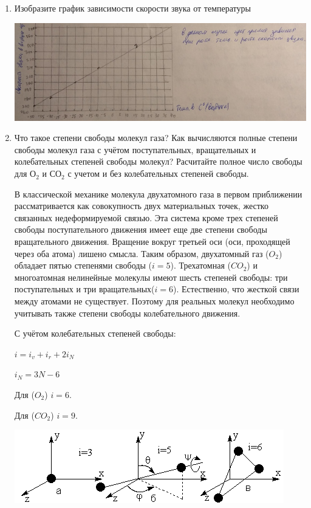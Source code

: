 \documentclass[12pt,a4paper]{article}%
\begin{document}
\begin{enumerate}
	
	\item Изобразите график зависимости скорости звука от температуры
	
	\includegraphics[width = 1\linewidth]{g}
	
	\item Что такое степени свободы молекул газа? Как вычисляются полные степени свободы молекул газа с учётом поступательных, вращательных и колебательных степеней свободы молекул? Расчитайте полное число свободы для О$ _2 $ и СО$ _2 $ с учетом и без колебательных степеней свободы.
	
	В классической механике молекула
	двухатомного газа в первом приближении рассматривается как совокупность
	двух материальных точек, жестко связанных недеформируемой связью. Эта система кроме трех степеней
	свободы поступательного движения имеет еще две степени свободы вращательного движения. Вращение вокруг третьей оси (оси, проходящей через оба атома) лишено смысла. Таким образом,
	двухатомный газ ($O_2$) обладает пятью степенями свободы ($i = 5$).
	Трехатомная ($CO_2$) и многоатомная нелинейные молекулы имеют
	шесть степеней свободы: три поступательных и три вращательных($i = 6$). Естественно, что жесткой связи между атомами не существует. Поэтому для реальных молекул необходимо учитывать
	также степени свободы колебательного движения.
	
	С учётом колебательных степеней свободы:
	
	$i = i_{v} + i_{r} + 2i_{N}$
	
	$i_N = 3N - 6$
	
	Для ($O_2$)  $i = 6$.
	
	Для ($CO_2$) $i = 9$.
	
	\includegraphics[width = 1\linewidth]{mol}
	

\end{enumerate}
\end{document}
